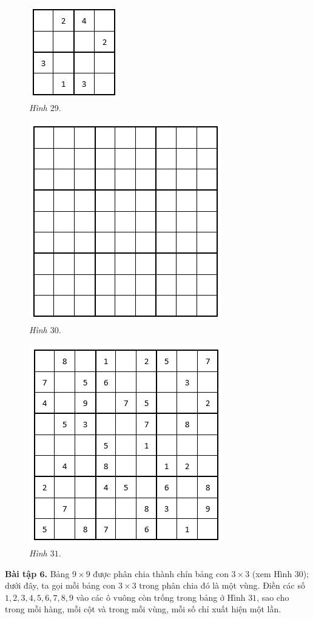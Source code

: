 	\begin{multicols}{3}
		\begin{figure}[H]
			\centering
			\vspace*{-5pt}
			\captionsetup{labelformat= empty, justification=centering}
			\includegraphics[height=0.22\textwidth]{pic18}
			\caption{\small\textit{Hình $29.$}}
			\vspace*{-10pt}
		\end{figure}
		\begin{figure}[H]
			\centering
			\vspace*{-5pt}
			\captionsetup{labelformat= empty, justification=centering}
			\includegraphics[height=0.22\textwidth]{pic21}
			\caption{\small\textit{Hình $30.$}}
			\vspace*{-10pt}
		\end{figure}
		\begin{figure}[H]
			\centering
			\vspace*{-5pt}
			\captionsetup{labelformat= empty, justification=centering}
			\includegraphics[height=0.22\textwidth]{pic22}
			\caption{\small\textit{ Hình $31.$}}
			\vspace*{-10pt}
		\end{figure}
	\end{multicols}
	\textbf{\color{toancuabi}Bài tập $\pmb{6}$.} Bảng $9\times9$ được phân chia thành chín bảng con $3\times3$ (xem Hình $30$); dưới đây, ta gọi mỗi bảng con $3\times3$ trong phân chia đó là  một vùng.
	\vskip 0.1cm
	Điền các số $1, 2, 3, 4, 5, 6, 7, 8, 9$ vào các ô vuông còn trống trong bảng ở Hình $31$, sao cho trong mỗi hàng, mỗi cột và trong mỗi vùng, mỗi số chỉ xuất hiện một lần.